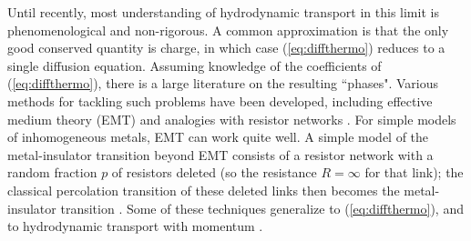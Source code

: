 \documentclass[10pt, oneside]{book}
\begin{document}
\begin{doublespace}
Until recently, most understanding of hydrodynamic transport in this limit is phenomenological and non-rigorous.   A common approximation is that the only good conserved quantity is charge, in which case (\ref{eq:diffthermo}) reduces to a single diffusion equation.  Assuming knowledge of the coefficients of (\ref{eq:diffthermo}), there is a large literature on the resulting ``phases".   Various methods for tackling such problems have been developed, including effective medium theory (EMT) \cite{Landauer1952} and analogies with resistor networks \cite{Kirkpatrick1971}.    For simple models of inhomogeneous metals,  EMT can work quite well.  A simple model of the metal-insulator transition  beyond EMT consists of a resistor network with a random fraction $p$ of resistors deleted (so the resistance $R=\infty$ for that link);  the classical percolation transition of these deleted links then becomes the metal-insulator transition \cite{Kirkpatrick1971}.  Some of these techniques generalize to (\ref{eq:diffthermo}), and to hydrodynamic transport with momentum \cite{Lucas:2015lna}.


\end{doublespace}
\end{document}

